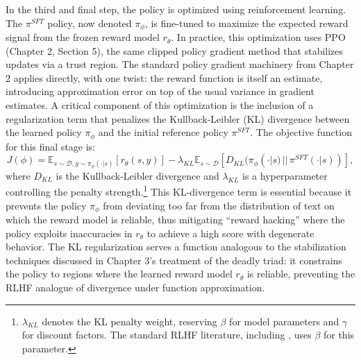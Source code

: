 In the third and final step, the policy is optimized using reinforcement learning. The $\pi^{SFT}$ policy, now denoted $\pi_\phi$, is fine-tuned to maximize the expected reward signal from the frozen reward model $r_\theta$. In practice, this optimization uses PPO (Chapter 2, Section 5), the same clipped policy gradient method that stabilizes updates via a trust region. The standard policy gradient machinery from Chapter 2 applies directly, with one twist: the reward function is itself an estimate, introducing approximation error on top of the usual variance in gradient estimates. A critical component of this optimization is the inclusion of a regularization term that penalizes the Kullback-Leibler (KL) divergence between the learned policy $\pi_\phi$ and the initial reference policy $\pi^{SFT}$. The objective function for this final stage is:
\begin{equation}
    J(\phi) = \mathbb{E}_{s \sim \mathcal{D}, y \sim \pi_\phi(\cdot|s)} [r_\theta(s, y)] - \lambda_{KL} \mathbb{E}_{s \sim \mathcal{D}} [D_{KL}(\pi_\phi(\cdot|s) \,||\, \pi^{SFT}(\cdot|s))],
\label{eq:rlhf_objective}
\end{equation}
where $D_{KL}$ is the Kullback-Leibler divergence and $\lambda_{KL}$ is a hyperparameter controlling the penalty strength.\footnote{$\lambda_{KL}$ denotes the KL penalty weight, reserving $\beta$ for model parameters and $\gamma$ for discount factors. The standard RLHF literature, including \citet{rafailov2023direct}, uses $\beta$ for this parameter.} This KL-divergence term is essential because it prevents the policy $\pi_\phi$ from deviating too far from the distribution of text on which the reward model is reliable, thus mitigating ``reward hacking'' where the policy exploits inaccuracies in $r_\theta$ to achieve a high score with degenerate behavior. The KL regularization serves a function analogous to the stabilization techniques discussed in Chapter 3's treatment of the deadly triad: it constrains the policy to regions where the learned reward model $r_\theta$ is reliable, preventing the RLHF analogue of divergence under function approximation.

